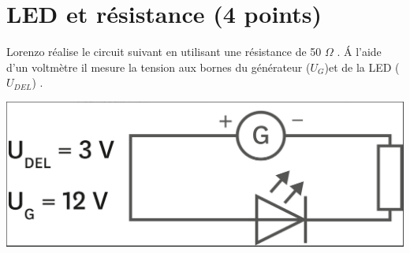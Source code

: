 \section{LED et résistance (4 points)}

Lorenzo réalise le circuit suivant en utilisant une résistance de 50 $\Omega$ . \'A l'aide d'un voltmètre il mesure la tension aux bornes du générateur ($U_G$)et de la LED ($U_{DEL}$) .

\begin{center}
	\includegraphics[scale=0.2]{img/circuit}
\end{center}

